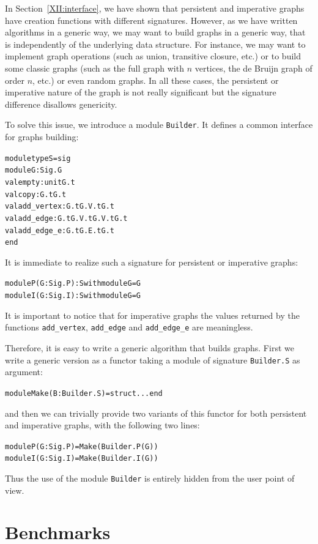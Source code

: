 In Section~\ref{XII:interface}, we have shown that persistent and
imperative graphs have creation functions with different signatures.
However, as we have written algorithms in a generic way, we may want
to build graphs in a generic way, that is independently of the
underlying data structure. For instance, we may want to implement
graph operations (such as union, transitive closure, etc.) or to build
some classic graphs (such as the full graph with $n$ vertices, the de
Bruijn graph of order $n$, etc.) or even random graphs. In all these
cases, the persistent or imperative nature of the graph is not really
significant but the signature difference disallows genericity.

To solve this issue, we introduce a module \texttt{Builder}. It
defines a common interface for graphs building:
\begin{alltt}
module type S = sig
  module G : Sig.G
  val empty : unit \fl G.t
  val copy : G.t \fl G.t
  val add_vertex : G.t \fl G.V.t \fl G.t
  val add_edge : G.t \fl G.V.t \fl G.V.t \fl G.t
  val add_edge_e : G.t \fl G.E.t \fl G.t
end
\end{alltt}
It is immediate to realize such a signature for persistent or
imperative graphs:
\begin{alltt}
module P(G : Sig.P) : S with module G = G
module I(G : Sig.I) : S with module G = G
\end{alltt}
It is important to notice that for imperative graphs the values
returned by the functions \texttt{add\_vertex},
\texttt{add\_edge} and \texttt{add\_edge\_e} are meaningless.

Therefore, it is easy to write a generic algorithm that builds graphs.
First we write a generic version as a functor taking a module of
signature \texttt{Builder.S} as argument:
\begin{alltt}
module Make(B : Builder.S) = struct ... end
\end{alltt}
and then we can trivially provide two variants of this functor for
both persistent and imperative graphs, with the following two lines:
\begin{alltt}
module P(G : Sig.P) = Make(Builder.P(G))
module I(G : Sig.I) = Make(Builder.I(G))
\end{alltt}
Thus the use of the module \texttt{Builder} is entirely hidden from
the user point of view.


\section{Benchmarks}\label{XII:bench}

